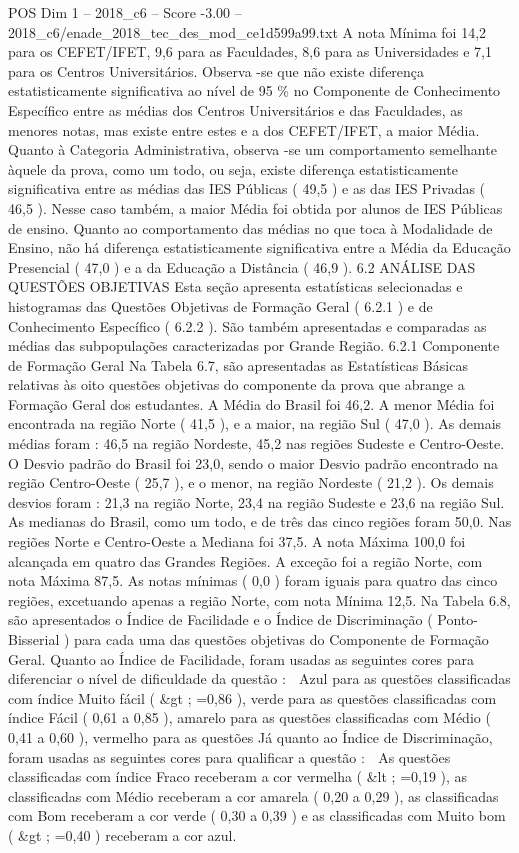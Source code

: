 \begin{textsample}{POS Dim 1 – 2018\_c6 – Score -3.00 – 2018\_c6/enade\_2018\_tec\_des\_mod\_ce1d599a99.txt}
A nota Mínima foi 14,2 para os CEFET/IFET, 9,6 para as Faculdades, 8,6 para as Universidades e 7,1 para os Centros Universitários.
Observa -se que não existe diferença estatisticamente significativa ao nível de 95 \% no Componente de Conhecimento Específico entre as médias dos Centros Universitários e das Faculdades, as menores notas, mas existe entre estes e a dos CEFET/IFET, a maior Média.
Quanto à Categoria Administrativa, observa -se um comportamento semelhante àquele da prova, como um todo, ou seja, existe diferença estatisticamente significativa entre as médias das IES Públicas ( 49,5 ) e as das IES Privadas ( 46,5 ).
Nesse caso também, a maior Média foi obtida por alunos de IES Públicas de ensino.
Quanto ao comportamento das médias no que toca à Modalidade de Ensino, não há diferença estatisticamente significativa entre a Média da Educação Presencial ( 47,0 ) e a da Educação a Distância ( 46,9 ). 6.2 ANÁLISE DAS QUESTÕES OBJETIVAS Esta seção apresenta estatísticas selecionadas e histogramas das Questões Objetivas de Formação Geral ( 6.2.1 ) e de Conhecimento Específico ( 6.2.2 ).
São também apresentadas e comparadas as médias das subpopulações caracterizadas por Grande Região. 6.2.1 Componente de Formação Geral Na Tabela 6.7, são apresentadas as Estatísticas Básicas relativas às oito questões objetivas do componente da prova que abrange a Formação Geral dos estudantes.
A Média do Brasil foi 46,2.
A menor Média foi encontrada na região Norte ( 41,5 ), e a maior, na região Sul ( 47,0 ).
As demais médias foram : 46,5 na região Nordeste, 45,2 nas regiões Sudeste e Centro-Oeste.
O Desvio padrão do Brasil foi 23,0, sendo o maior Desvio padrão encontrado na região Centro-Oeste ( 25,7 ), e o menor, na região Nordeste ( 21,2 ).
Os demais desvios foram : 21,3 na região Norte, 23,4 na região Sudeste e 23,6 na região Sul.
As medianas do Brasil, como um todo, e de três das cinco regiões foram 50,0.
Nas regiões Norte e Centro-Oeste a Mediana foi 37,5.
A nota Máxima 100,0 foi alcançada em quatro das Grandes Regiões.
A exceção foi a região Norte, com nota Máxima 87,5.
As notas mínimas ( 0,0 ) foram iguais para quatro das cinco regiões, excetuando apenas a região Norte, com nota Mínima 12,5.
Na Tabela 6.8, são apresentados o Índice de Facilidade e o Índice de Discriminação ( Ponto-Bisserial ) para cada uma das questões objetivas do Componente de Formação Geral.
Quanto ao Índice de Facilidade, foram usadas as seguintes cores para diferenciar o nível de dificuldade da questão :  Azul para as questões classificadas com índice Muito fácil ( \&gt ; =0,86 ), verde para as questões classificadas com índice Fácil ( 0,61 a 0,85 ), amarelo para as questões classificadas com Médio ( 0,41 a 0,60 ), vermelho para as questões Já quanto ao Índice de Discriminação, foram usadas as seguintes cores para qualificar a questão :  As questões classificadas com índice Fraco receberam a cor vermelha ( \&lt ; =0,19 ), as classificadas com Médio receberam a cor amarela ( 0,20 a 0,29 ), as classificadas com Bom receberam a cor verde ( 0,30 a 0,39 ) e as classificadas com Muito bom ( \&gt ; =0,40 ) receberam a cor azul.

\end{textsample}

